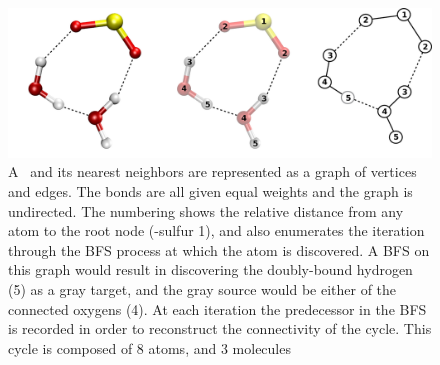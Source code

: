 \begin{figure}[h!]
	\begin{center}
		\includegraphics[scale=1.0]{images/Cycles/so2complexfigure.png}
		\caption{A \suldiox~and its nearest neighbors are represented as a graph of vertices and edges. The bonds are all given equal weights and the graph is undirected. The numbering shows the relative distance from any atom to the root node (\suldiox-sulfur 1), and also enumerates the iteration through the BFS process at which the atom is discovered. A BFS on this graph would result in discovering the doubly-bound hydrogen (5) as a gray target, and the gray source would be either of the connected oxygens (4). At each iteration the predecessor in the BFS is recorded in order to reconstruct the connectivity of the cycle. This cycle is composed of 8 atoms, and 3 molecules}
		\label{fig:so2-complex-graph}
	\end{center}
\end{figure}
